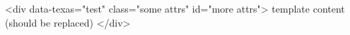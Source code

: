 <div data-texas="test" class="some attrs" id="more attrs">
  template content (should be replaced)
</div>
